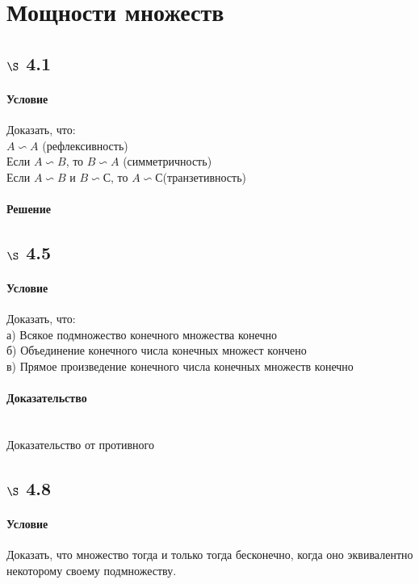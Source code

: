 \documentclass[a4paper,12pt]{article}
\begin{document}
\section{Мощности множеств}
\subsection*{$\S$ 4.1}
\paragraph*{Условие}
Доказать, что:\\
$ A \backsim A $ (рефлексивность)\\
Если $ A \backsim B $, то $ B \backsim A $ (симметричность)\\
Если $ A \backsim B $ и $ B \backsim С $, то $ A \backsim С $(транзетивность)
\paragraph*{Решение}

\subsection*{$\S$ 4.5}
\paragraph*{Условие}
Доказать, что:\\
а) Всякое подмножество конечного множества конечно\\
б) Объединение конечного числа конечных множест кончено\\
в) Прямое произведение конечного числа конечных множеств конечно
\paragraph*{Доказательство}\mbox{}\\
Доказательство от противного 

\subsection*{$\S$ 4.8}
\paragraph*{Условие}
Доказать, что множество тогда и только тогда бесконечно, когда оно эквивалентно некоторому своему подмножеству.
\end{document}

